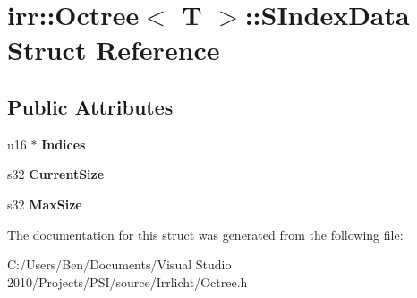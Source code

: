 \hypertarget{structirr_1_1_octree_1_1_s_index_data}{\section{irr\-:\-:Octree$<$ T $>$\-:\-:S\-Index\-Data Struct Reference}
\label{structirr_1_1_octree_1_1_s_index_data}
}
\subsection*{Public Attributes}
\begin{DoxyCompactItemize}
\item 
\hypertarget{structirr_1_1_octree_1_1_s_index_data_a5f50e0a33969035b944e6a24530fee68}{u16 $\ast$ {\bfseries Indices}}\label{structirr_1_1_octree_1_1_s_index_data_a5f50e0a33969035b944e6a24530fee68}

\item 
\hypertarget{structirr_1_1_octree_1_1_s_index_data_a63e9c9e0472a7e6afc39b32821ef0613}{s32 {\bfseries Current\-Size}}\label{structirr_1_1_octree_1_1_s_index_data_a63e9c9e0472a7e6afc39b32821ef0613}

\item 
\hypertarget{structirr_1_1_octree_1_1_s_index_data_a180d59c1c306079ce6de18ab12e058e7}{s32 {\bfseries Max\-Size}}\label{structirr_1_1_octree_1_1_s_index_data_a180d59c1c306079ce6de18ab12e058e7}

\end{DoxyCompactItemize}


The documentation for this struct was generated from the following file\-:\begin{DoxyCompactItemize}
\item 
C\-:/\-Users/\-Ben/\-Documents/\-Visual Studio 2010/\-Projects/\-P\-S\-I/source/\-Irrlicht/Octree.\-h\end{DoxyCompactItemize}
